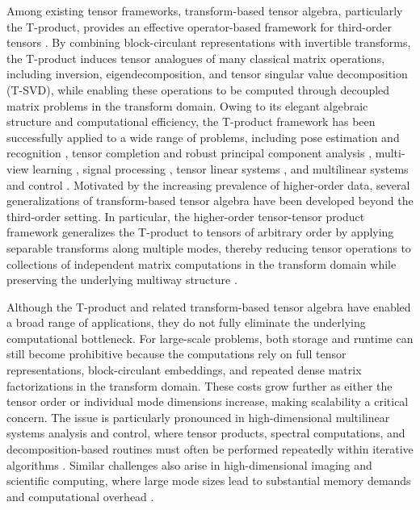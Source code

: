 \documentclass[onefignum,onetabnum]{siamart250211}
\begin{document}
Among existing tensor frameworks, transform-based tensor algebra, particularly the T-product, provides an effective operator-based framework for third-order tensors \cite{braman2010third,cao2023some,kilmer2013third,kilmer2011factorization,lund2020tensor,miao2021t}. By combining block-circulant representations with invertible transforms, the T-product induces tensor analogues of many classical matrix operations, including inversion, eigendecomposition, and tensor singular value decomposition (T-SVD), while enabling these operations to be computed through decoupled matrix problems in the transform domain. Owing to its elegant algebraic structure and computational efficiency, the T-product framework has been successfully applied to a wide range of problems, including pose estimation and recognition \cite{hao2013facial,hoover2011pose}, tensor completion and robust principal component analysis \cite{he2022tensor,lu2019tensor,zhang2016exact}, multi-view learning \cite{wang2026towards, wu2019essential,yin2018multiview}, signal processing \cite{11430563,pena2023t,saibaba2025tensor}, tensor linear systems \cite{ma2022randomized}, and multilinear systems and control \cite{ding2025tensor,he2026data,hoover2021new,ma2025multilinear,mao2025data,mei2026data,mei2025controllability}. Motivated by the increasing prevalence of higher-order data, several generalizations of transform-based tensor algebra have been developed beyond the third-order setting. In particular, the higher-order tensor-tensor product framework generalizes the T-product to tensors of arbitrary order by applying separable transforms along multiple modes, thereby reducing tensor operations to collections of independent matrix computations in the transform domain while preserving the underlying multiway structure \cite{kernfeld2015tensor, martin2013order,ozdemir2022high,wang2022hot}.

Although the T-product and related transform-based tensor algebra have enabled a broad range of applications, they do not fully eliminate the underlying computational bottleneck. For large-scale problems, both storage and runtime can still become prohibitive because the computations rely on full tensor representations, block-circulant embeddings, and repeated dense matrix factorizations in the transform domain. These costs grow further as either the tensor order or individual mode dimensions increase, making scalability a critical concern. The issue is particularly pronounced in high-dimensional multilinear systems analysis and control, where tensor products, spectral computations, and decomposition-based routines must often be performed repeatedly within iterative algorithms \cite{he2026data,mao2025data,mei2026data}. Similar challenges also arise in high-dimensional imaging and scientific computing, where large mode sizes lead to substantial memory demands and computational overhead \cite{bachmayr2018parametric,bengua2017efficient,chang2020weighted}.
\end{document}
